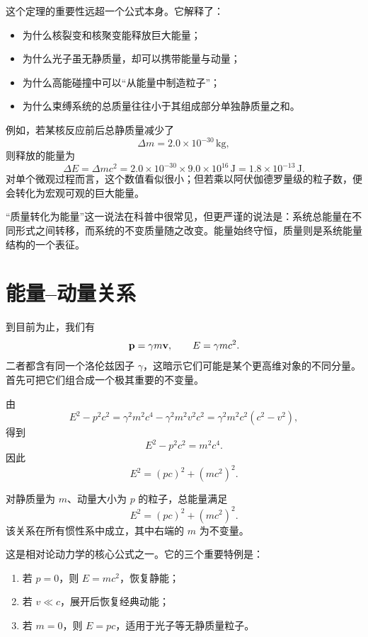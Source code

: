 这个定理的重要性远超一个公式本身。它解释了：
\begin{itemize}
  \item 为什么核裂变和核聚变能释放巨大能量；
  \item 为什么光子虽无静质量，却可以携带能量与动量；
  \item 为什么高能碰撞中可以“从能量中制造粒子”；
  \item 为什么束缚系统的总质量往往小于其组成部分单独静质量之和。
\end{itemize}

例如，若某核反应前后总静质量减少了
\[
\Delta m = 2.0\times 10^{-30}\,\mathrm{kg},
\]
则释放的能量为
\[
\Delta E = \Delta m c^2 = 2.0\times 10^{-30}\times 9.0\times 10^{16}\,\mathrm{J}
=1.8\times 10^{-13}\,\mathrm{J}.
\]
对单个微观过程而言，这个数值看似很小；但若乘以阿伏伽德罗量级的粒子数，便会转化为宏观可观的巨大能量。

\begin{remark}
“质量转化为能量”这一说法在科普中很常见，但更严谨的说法是：系统总能量在不同形式之间转移，而系统的不变质量随之改变。能量始终守恒，质量则是系统能量结构的一个表征。
\end{remark}

\section{能量--动量关系}

到目前为止，我们有
\[
\vb{p}=\gamma m\vb{v},
\qquad
E=\gamma mc^2.
\]
二者都含有同一个洛伦兹因子 $\gamma$，这暗示它们可能是某个更高维对象的不同分量。首先可把它们组合成一个极其重要的不变量。

由
\[
E^2-p^2c^2 = \gamma^2 m^2 c^4 - \gamma^2 m^2 v^2 c^2
= \gamma^2 m^2 c^2(c^2-v^2),
\]
得到
\[
E^2-p^2c^2 = m^2 c^4.
\]
因此
\[
E^2=(pc)^2+(mc^2)^2.
\]

\begin{theorem}[能量--动量关系]
对静质量为 $m$、动量大小为 $p$ 的粒子，总能量满足
\[
E^2=(pc)^2+(mc^2)^2.
\]
该关系在所有惯性系中成立，其中右端的 $m$ 为不变量。
\end{theorem}

这是相对论动力学的核心公式之一。它的三个重要特例是：
\begin{enumerate}
  \item 若 $p=0$，则 $E=mc^2$，恢复静能；
  \item 若 $v\ll c$，展开后恢复经典动能；
  \item 若 $m=0$，则 $E=pc$，适用于光子等无静质量粒子。
\end{enumerate}

